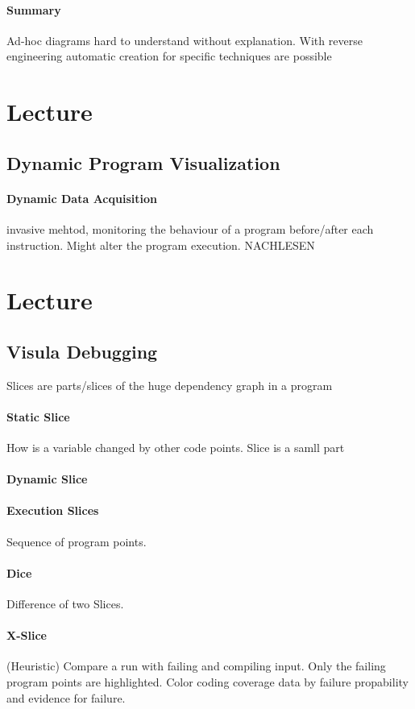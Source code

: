 \documentclass[10pt,a4paper]{article}
\begin{document}
	\paragraph{Summary}
	Ad-hoc diagrams hard to understand without explanation. With reverse engineering automatic creation for specific techniques are possible 
	
\section{Lecture}
	\subsection{Dynamic Program Visualization}
	
	\paragraph{Dynamic Data Acquisition} invasive mehtod, monitoring the behaviour of a program before/after each instruction. Might alter the program execution. 
	NACHLESEN
	
	\section{Lecture}
	\subsection{Visula Debugging}
	Slices are parts/slices of the huge dependency graph in a program 
	\paragraph{Static Slice} How is a variable changed by other code points. Slice is a samll part
	\paragraph{Dynamic Slice} 
	\paragraph{Execution Slices} Sequence of program points.
	
	\paragraph{Dice} Difference of two Slices.
	
	\paragraph{X-Slice} (Heuristic) Compare a run with failing and compiling input. Only the failing program points are highlighted. Color coding coverage data by failure propability and evidence for failure.
	
\end{document}
